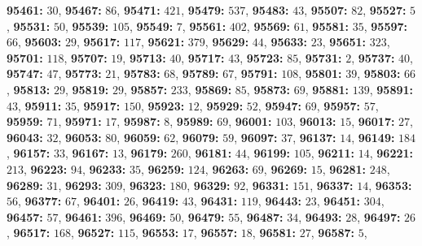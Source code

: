 \textsf{\bfseries 95461:} $30$, \textsf{\bfseries 95467:} $86$, \textsf{\bfseries 95471:} $421$, \textsf{\bfseries 95479:} $537$, \textsf{\bfseries 95483:} $43$, \textsf{\bfseries 95507:} $82$, \textsf{\bfseries 95527:} $5$, \textsf{\bfseries 95531:} $50$, \textsf{\bfseries 95539:} $105$, \textsf{\bfseries 95549:} $7$, \textsf{\bfseries 95561:} $402$, \textsf{\bfseries 95569:} $61$, \textsf{\bfseries 95581:} $35$, \textsf{\bfseries 95597:} $66$, \textsf{\bfseries 95603:} $29$, \textsf{\bfseries 95617:} $117$, \textsf{\bfseries 95621:} $379$, \textsf{\bfseries 95629:} $44$, \textsf{\bfseries 95633:} $23$, \textsf{\bfseries 95651:} $323$, \textsf{\bfseries 95701:} $118$, \textsf{\bfseries 95707:} $19$, \textsf{\bfseries 95713:} $40$, \textsf{\bfseries 95717:} $43$, \textsf{\bfseries 95723:} $85$, \textsf{\bfseries 95731:} $2$, \textsf{\bfseries 95737:} $40$, \textsf{\bfseries 95747:} $47$, \textsf{\bfseries 95773:} $21$, \textsf{\bfseries 95783:} $68$, \textsf{\bfseries 95789:} $67$, \textsf{\bfseries 95791:} $108$, \textsf{\bfseries 95801:} $39$, \textsf{\bfseries 95803:} $66$, \textsf{\bfseries 95813:} $29$, \textsf{\bfseries 95819:} $29$, \textsf{\bfseries 95857:} $233$, \textsf{\bfseries 95869:} $85$, \textsf{\bfseries 95873:} $69$, \textsf{\bfseries 95881:} $139$, \textsf{\bfseries 95891:} $43$, \textsf{\bfseries 95911:} $35$, \textsf{\bfseries 95917:} $150$, \textsf{\bfseries 95923:} $12$, \textsf{\bfseries 95929:} $52$, \textsf{\bfseries 95947:} $69$, \textsf{\bfseries 95957:} $57$, \textsf{\bfseries 95959:} $71$, \textsf{\bfseries 95971:} $17$, \textsf{\bfseries 95987:} $8$, \textsf{\bfseries 95989:} $69$, \textsf{\bfseries 96001:} $103$, \textsf{\bfseries 96013:} $15$, \textsf{\bfseries 96017:} $27$, \textsf{\bfseries 96043:} $32$, \textsf{\bfseries 96053:} $80$, \textsf{\bfseries 96059:} $62$, \textsf{\bfseries 96079:} $59$, \textsf{\bfseries 96097:} $37$, \textsf{\bfseries 96137:} $14$, \textsf{\bfseries 96149:} $184$, \textsf{\bfseries 96157:} $33$, \textsf{\bfseries 96167:} $13$, \textsf{\bfseries 96179:} $260$, \textsf{\bfseries 96181:} $44$, \textsf{\bfseries 96199:} $105$, \textsf{\bfseries 96211:} $14$, \textsf{\bfseries 96221:} $213$, \textsf{\bfseries 96223:} $94$, \textsf{\bfseries 96233:} $35$, \textsf{\bfseries 96259:} $124$, \textsf{\bfseries 96263:} $69$, \textsf{\bfseries 96269:} $15$, \textsf{\bfseries 96281:} $248$, \textsf{\bfseries 96289:} $31$, \textsf{\bfseries 96293:} $309$, \textsf{\bfseries 96323:} $180$, \textsf{\bfseries 96329:} $92$, \textsf{\bfseries 96331:} $151$, \textsf{\bfseries 96337:} $14$, \textsf{\bfseries 96353:} $56$, \textsf{\bfseries 96377:} $67$, \textsf{\bfseries 96401:} $26$, \textsf{\bfseries 96419:} $43$, \textsf{\bfseries 96431:} $119$, \textsf{\bfseries 96443:} $23$, \textsf{\bfseries 96451:} $304$, \textsf{\bfseries 96457:} $57$, \textsf{\bfseries 96461:} $396$, \textsf{\bfseries 96469:} $50$, \textsf{\bfseries 96479:} $55$, \textsf{\bfseries 96487:} $34$, \textsf{\bfseries 96493:} $28$, \textsf{\bfseries 96497:} $26$, \textsf{\bfseries 96517:} $168$, \textsf{\bfseries 96527:} $115$, \textsf{\bfseries 96553:} $17$, \textsf{\bfseries 96557:} $18$, \textsf{\bfseries 96581:} $27$, \textsf{\bfseries 96587:} $5$, 
